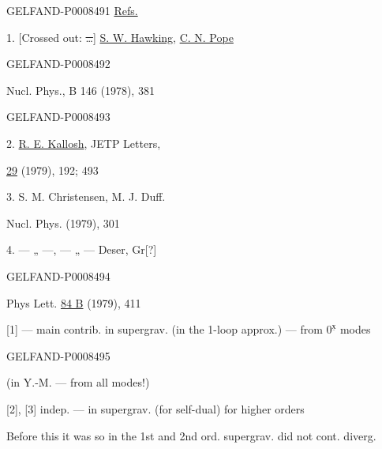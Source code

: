 \begin{GelfandAdjacentEvidence}{GELFAND-P000849}{1}
\uline{Refs.}

1. [Crossed out: \sout{…}] \uline{S. W. Hawking}, \uline{C. N. Pope}
\end{GelfandAdjacentEvidence}
\begin{GelfandAdjacentEvidence}{GELFAND-P000849}{2}


Nucl. Phys., B 146 (1978), 381
\end{GelfandAdjacentEvidence}
\begin{GelfandAdjacentEvidence}{GELFAND-P000849}{3}


2. \uline{R. E. Kallosh}, JETP Letters,

\uline{29} (1979), 192; 493

3. S. M. Christensen, M. J. Duff.

Nucl. Phys. (1979), 301

4. — „ —, — „ — Deser, Gr[?]
\end{GelfandAdjacentEvidence}
\begin{GelfandAdjacentEvidence}{GELFAND-P000849}{4}


Phys Lett. \uline{84 B} (1979), 411

[1] — main contrib. in supergrav. (in the 1-loop approx.) — from \(0^{\underline{\text{х}}}\) modes
\end{GelfandAdjacentEvidence}
\begin{GelfandAdjacentEvidence}{GELFAND-P000849}{5}


(in Y.-M. — from all modes!)

[2], [3] indep. — in supergrav. (for self-dual) for higher orders

Before this it was so in the 1st and 2nd ord. supergrav. did not cont. diverg.
\end{GelfandAdjacentEvidence}
